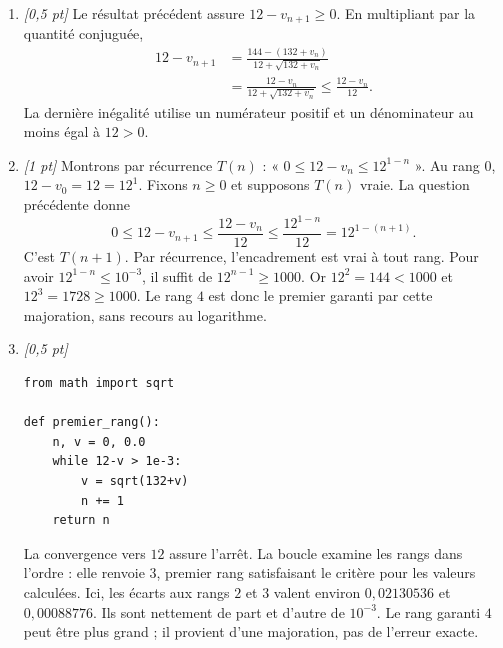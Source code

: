 \begin{enumerate}
\item \textit{[0,5 pt]} Le résultat précédent assure $12-v_{n+1}\ge0$. En multipliant par la quantité conjuguée,
\[\begin{aligned}12-v_{n+1}&=\frac{144-(132+v_n)}{12+\sqrt{132+v_n}}\\&=\frac{12-v_n}{12+\sqrt{132+v_n}}\le\frac{12-v_n}{12}.\end{aligned}\]
La dernière inégalité utilise un numérateur positif et un dénominateur au moins égal à $12>0$.

\item \textit{[1 pt]} Montrons par récurrence $T(n)$ : « $0\le 12-v_n\le 12^{1-n}$ ».
Au rang $0$, $12-v_0=12=12^1$. Fixons $n\ge0$ et supposons $T(n)$ vraie. La question précédente donne
\[0\le 12-v_{n+1}\le\frac{12-v_n}{12}\le\frac{12^{1-n}}{12}=12^{1-(n+1)}.\]
C'est $T(n+1)$. Par récurrence, l'encadrement est vrai à tout rang.
Pour avoir $12^{1-n}\le10^{-3}$, il suffit de $12^{n-1}\ge1000$.
Or $12^{2}=144<1000$ et $12^{3}=1728\ge1000$. Le rang $4$ est donc le premier garanti par cette majoration, sans recours au logarithme.


\item \textit{[0,5 pt]} 
\begin{lstlisting}
from math import sqrt

def premier_rang():
    n, v = 0, 0.0
    while 12-v > 1e-3:
        v = sqrt(132+v)
        n += 1
    return n
\end{lstlisting}
La convergence vers $12$ assure l'arrêt. La boucle examine les rangs dans l'ordre : elle renvoie $3$, premier rang satisfaisant le critère pour les valeurs calculées. Ici, les écarts aux rangs $2$ et $3$ valent environ $0{,}02130536$ et $0{,}00088776$. Ils sont nettement de part et d'autre de $10^{-3}$. Le rang garanti $4$ peut être plus grand ; il provient d'une majoration, pas de l'erreur exacte.

\end{enumerate}


